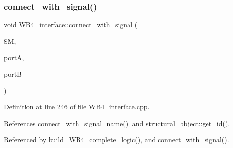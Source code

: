 \subsubsection{\texorpdfstring{connect\+\_\+with\+\_\+signal()}{connect\_with\_signal()}\hspace{0.1cm}{\footnotesize\ttfamily [1/4]}}
{\footnotesize\ttfamily void W\+B4\+\_\+interface\+::connect\+\_\+with\+\_\+signal (\begin{DoxyParamCaption}\item[{\hyperlink{structural__manager_8hpp_ab3136f0e785d8535f8d252a7b53db5b5}{structural\+\_\+manager\+Ref}}]{SM,  }\item[{\hyperlink{structural__objects_8hpp_a8ea5f8cc50ab8f4c31e2751074ff60b2}{structural\+\_\+object\+Ref}}]{portA,  }\item[{\hyperlink{structural__objects_8hpp_a8ea5f8cc50ab8f4c31e2751074ff60b2}{structural\+\_\+object\+Ref}}]{portB }\end{DoxyParamCaption})\hspace{0.3cm}{\ttfamily [protected]}}



Definition at line 246 of file W\+B4\+\_\+interface.\+cpp.



References connect\+\_\+with\+\_\+signal\+\_\+name(), and structural\+\_\+object\+::get\+\_\+id().



Referenced by build\+\_\+\+W\+B4\+\_\+complete\+\_\+logic(), and connect\+\_\+with\+\_\+signal().

